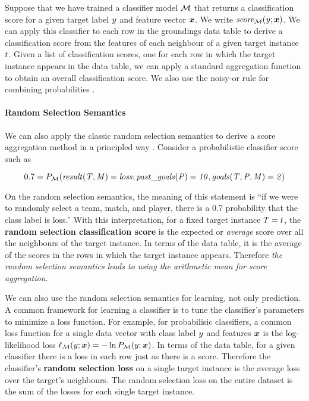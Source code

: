 \documentclass[oribibl]{llncs}%
\newcommand{\team}{T}
\newcommand{\player}{P}
\newcommand{\match}{M}
\begin{document}
Suppose that we have trained a classifier model $\mathcal{M}$ that returns a classification score for a given target label $y$ and feature vector $\boldsymbol{x}$. We write $\it{score}_{\mathcal{M}}(y;\boldsymbol{x})$. We can apply this classifier to each row in the groundings data table to derive a classification score from the features of each neighbour of a given target instance $t$.
%
Given a list of classification scores, one for each row in which the target instance appears in the data table, we can apply a standard aggregation function to obtain an overall classification score. We also use the noisy-or rule for combining probabilities \cite{Kersting2007}.

%

\paragraph{Random Selection Semantics} We can also apply the classic random selection semantics to derive a score aggregation method in a principled way \cite{Halpern90,Bacchus90}. Consider a probabilistic classifier score such as 

$$0.7 = P_{\classifier}(\it{result}(\team,\match) = loss; \it{past\_goals}(\player) = 10, \it{goals}(\team, \player,\match)= 2)$$

On the random selection semantics, the meaning of this statement is ``if we were to randomly select a team, match, and player, there is a 0.7 probability that the class label is loss.'' With this interpretation, for a fixed target instance $T = t$, the \textbf{random selection classification score}  is the expected or {\em average} score over all the neighbours of the target instance. In terms of the data table, it is the average of the scores in the rows in which the target instance appears. Therefore {\em the random selection semantics leads to using the arithmetic mean for score aggregation.} 

We can also use the random selection semantics for learning, not only prediction.  A common framework for learning a classifier is to tune the classifier's parameters to minimize a loss function.  For example, for probabilisic classifiers, a common loss function for a single data vector with class label $y$ and features $\boldsymbol{x}$ is the log-likelihood loss $\ell_{\mathcal{M}}(y;\boldsymbol{x}) = -\ln P_{\mathcal{M}}(y;\boldsymbol{x})$. In terms of the data table, for a given classifier there is a loss in each row just as there is a score. Therefore the classifier's \textbf{random selection loss} on a single target instance is the average loss over the target's neighbours. The random selection loss on the entire dataset is the sum of the losses for each single target instance. 
\end{document}
